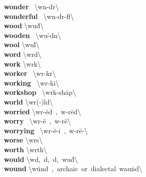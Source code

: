 \documentclass[10pt,a4paper]{article}
\begin{document}
\begin{multicols}{2}
\textbf{ wonder }\quad \ \textbackslash \textprimstress w\textschwa n-d\textschwa r\textbackslash \\
\textbf{ wonderful }\quad \ \textbackslash \textprimstress w\textschwa n-d\textschwa r-f\textschwa l\textbackslash \\
\textbf{ wood }\quad \textbackslash \textprimstress wu\. d\textbackslash \\
\textbf{ wooden }\quad \ \textbackslash \textprimstress wu\. -d\textsuperscript{\textreve}n\textbackslash \\
\textbf{ wool }\quad \textbackslash \textprimstress wu\. l\textbackslash \\
\textbf{ word }\quad \textbackslash \textprimstress w\textschwa rd\textbackslash \\
\textbf{ work }\quad \textbackslash \textprimstress w\textschwa rk\textbackslash \\
\textbf{ worker }\quad \ \textbackslash \textprimstress w\textschwa r-k\textschwa r\textbackslash \\
\textbf{ working }\quad \ \textbackslash \textprimstress w\textschwa r-ki\engma \textbackslash \\
\textbf{ workshop }\quad \ \textbackslash \textprimstress w\textschwa rk-\textsecstress sh\"{a}p\textbackslash \\
\textbf{ world }\quad \textbackslash \textprimstress w\textschwa r(-\textschwa )ld\textbackslash \\
\textbf{ worried }\quad \textbackslash \textprimstress w\textschwa r-\={e}d\ ,\ \textprimstress w\textschwa -r\={e}d\textbackslash \\
\textbf{ worry }\quad \ \textbackslash \textprimstress w\textschwa r-\={e}\ ,\ \textprimstress w\textschwa -r\={e}\textbackslash \\
\textbf{ worrying }\quad \ \textbackslash \textprimstress w\textschwa r-\={e}-i\engma \ ,\ \textprimstress w\textschwa -r\={e}-\textbackslash \\
\textbf{ worse }\quad \textbackslash \textprimstress w\textschwa rs\textbackslash \\
\textbf{ worth }\quad \textbackslash \textprimstress w\textschwa rth\textbackslash \\
\textbf{ would }\quad \textbackslash w\textschwa d,\ \textschwa d,\ d,\ \textprimstress wu\. d\textbackslash \\
\textbf{ wound }\quad \textbackslash \textprimstress w\"{u}nd\ ,\ archaic\ or\ dialectal\ \textprimstress wau\. nd\textbackslash \\

\end{multicols}
\end{document}
